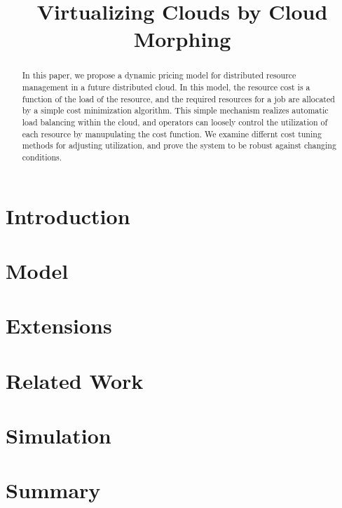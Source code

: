 \documentclass[10pt,sigconf,letterpaper,anonymous,nonacm]{acmart}
\title{Virtualizing Clouds by Cloud Morphing}
\begin{document}
\begin{abstract}

In this paper, we propose a dynamic pricing model for distributed
resource management in a future distributed cloud.
In this model, the resource cost is a function of the load of the
resource, and the required resources for a job are allocated by a
simple cost minimization algorithm.  This simple mechanism realizes
automatic load balancing within the cloud, and operators can loosely
control the utilization of each resource by manupulating the cost function.
We examine differnt cost tuning methods for adjusting utilization, and
prove the system to be robust against changing conditions.

\end{abstract}

\maketitle

\section{Introduction}



\section{Model}



\section{Extensions}



\section{Related Work}



\section{Simulation}



\section{Summary}



\end{document}
